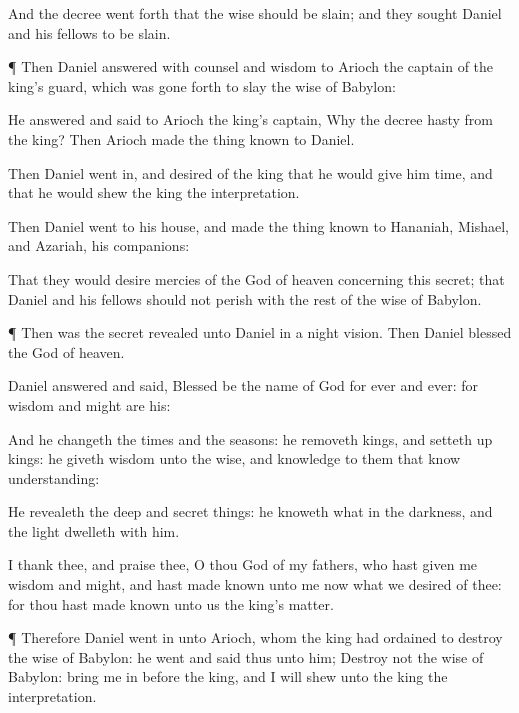 {And the
decree went
forth that the
wise
{} should be
slain; and they
sought
Daniel and his
fellows to be
slain.


\par }{\PP {}¶
Then
Daniel
answered with
counsel and
wisdom to
Arioch the
captain
of the
king’s
guard, which was gone
forth to
slay the
wise
{} of
Babylon:

He
answered and
said to
Arioch the
king’s
captain,
Why
{} the
decree
{}
hasty
from the
king?
Then
Arioch made the
thing
known to
Daniel.

Then
Daniel went
in, and
desired
of the
king that he would
give him
time, and that he would
shew the
king the
interpretation.

Then
Daniel
went to his
house, and made the
thing
known to
Hananiah,
Mishael, and
Azariah, his
companions:

That they would
desire
mercies
of the
God of
heaven
concerning
this
secret; that
Daniel and his
fellows should
not
perish
with the
rest of the
wise
{} of
Babylon.


\par }{\PP {}¶
Then was the
secret
revealed unto
Daniel in a
night
vision.
Then
Daniel
blessed the
God of
heaven.

Daniel
answered and
said,
Blessed
be the
name of
God
for
ever and
ever: for
wisdom and
might
are his:

And he
changeth the
times and the
seasons: he
removeth
kings, and setteth
up
kings: he
giveth
wisdom unto the
wise, and
knowledge to them that
know
understanding:

He
revealeth the
deep and secret
things: he
knoweth
what
{} in the
darkness, and the
light
dwelleth with
him.

I
thank thee, and
praise thee, O thou
God of my
fathers, who hast
given me
wisdom and
might, and hast made
known unto me
now what we
desired of
thee: for thou hast
{} made
known unto us the
king’s
matter.


\par }{\PP {}¶
Therefore
Daniel went
in
unto
Arioch, whom the
king had
ordained to
destroy the
wise
{} of
Babylon: he
went and
said
thus unto him;
Destroy
not the
wise
{} of
Babylon: bring me
in
before the
king, and I will
shew unto the
king the
interpretation.

}
